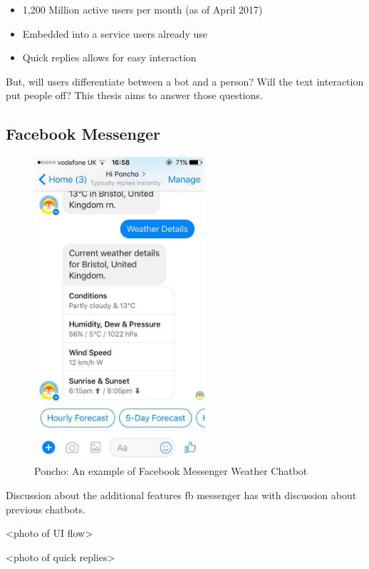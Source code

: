 \begin{itemize}
  \item 1,200 Million active users per month (as of April 2017)~\cite{fb_messenger_stats}
  \item Embedded into a service users already use
  \item Quick replies allows for easy interaction
\end{itemize}

But, will users differentiate between a bot and a person? Will the text interaction put people off? This thesis aims to answer those questions.

\subsection{Facebook Messenger}

\begin{figure}[H] %
    \centering
    \includegraphics[width=2.5in]{../resources/existing-bots/poncho.jpg}
    \caption{Poncho: An example of Facebook Messenger Weather Chatbot}
    \label{fig:poncho}
\end{figure}

Discussion about the additional features fb messenger has with discussion about previous chatbots.

<photo of UI flow>

<photo of quick replies>

